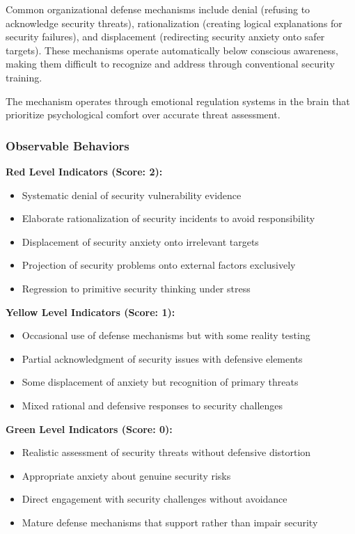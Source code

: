 \documentclass[11pt,a4paper]{article}
\begin{document}
Common organizational defense mechanisms include denial (refusing to acknowledge security threats), rationalization (creating logical explanations for security failures), and displacement (redirecting security anxiety onto safer targets). These mechanisms operate automatically below conscious awareness, making them difficult to recognize and address through conventional security training.

The mechanism operates through emotional regulation systems in the brain that prioritize psychological comfort over accurate threat assessment\cite{gross2015}.

\subsubsection{Observable Behaviors}

\textbf{Red Level Indicators (Score: 2):}
\begin{itemize}
\item Systematic denial of security vulnerability evidence
\item Elaborate rationalization of security incidents to avoid responsibility
\item Displacement of security anxiety onto irrelevant targets
\item Projection of security problems onto external factors exclusively
\item Regression to primitive security thinking under stress
\end{itemize}

\textbf{Yellow Level Indicators (Score: 1):}
\begin{itemize}
\item Occasional use of defense mechanisms but with some reality testing
\item Partial acknowledgment of security issues with defensive elements
\item Some displacement of anxiety but recognition of primary threats
\item Mixed rational and defensive responses to security challenges
\end{itemize}

\textbf{Green Level Indicators (Score: 0):}
\begin{itemize}
\item Realistic assessment of security threats without defensive distortion
\item Appropriate anxiety about genuine security risks
\item Direct engagement with security challenges without avoidance
\item Mature defense mechanisms that support rather than impair security
\end{itemize}
\end{document}
